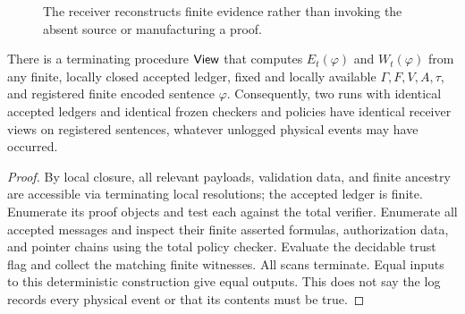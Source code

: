 \documentclass[11pt,letterpaper]{article}
\begin{document}
\begin{figure}[htbp]\centering
{}
\caption{The receiver reconstructs finite evidence rather than invoking the absent source or manufacturing a proof.}
\end{figure}

\begin{lemma}
There is a terminating procedure $\mathsf{View}$ that computes $E_t(\varphi)$ and $W_t(\varphi)$ from any finite, locally closed accepted ledger, fixed and locally available $\Gamma,F,V,A,\tau$, and registered finite encoded sentence $\varphi$. Consequently, two runs with identical accepted ledgers and identical frozen checkers and policies have identical receiver views on registered sentences, whatever unlogged physical events may have occurred.
\end{lemma}
\begin{proof}
By local closure, all relevant payloads, validation data, and finite ancestry are accessible via terminating local resolutions; the accepted ledger is finite. Enumerate its proof objects and test each against the total verifier. Enumerate all accepted messages and inspect their finite asserted formulas, authorization data, and pointer chains using the total policy checker. Evaluate the decidable trust flag and collect the matching finite witnesses. All scans terminate. Equal inputs to this deterministic construction give equal outputs. This does not say the log records every physical event or that its contents must be true.
\end{proof}
\end{document}
